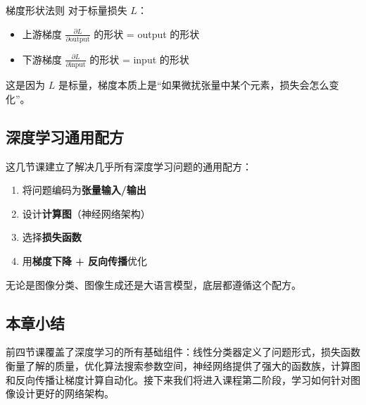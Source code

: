\begin{warningbox}{梯度形状法则}
对于标量损失 $L$：
\begin{itemize}
    \item 上游梯度 $\frac{\partial L}{\partial \text{output}}$ 的形状 = output 的形状
    \item 下游梯度 $\frac{\partial L}{\partial \text{input}}$ 的形状 = input 的形状
\end{itemize}
这是因为 $L$ 是标量，梯度本质上是``如果微扰张量中某个元素，损失会怎么变化''。
\end{warningbox}

\subsection{深度学习通用配方}

这几节课建立了解决几乎所有深度学习问题的通用配方：

\begin{enumerate}
    \item 将问题编码为\textbf{张量输入/输出}
    \item 设计\textbf{计算图}（神经网络架构）
    \item 选择\textbf{损失函数}
    \item 用\textbf{梯度下降 + 反向传播}优化
\end{enumerate}

无论是图像分类、图像生成还是大语言模型，底层都遵循这个配方。

\subsection{本章小结}

前四节课覆盖了深度学习的所有基础组件：线性分类器定义了问题形式，损失函数衡量了解的质量，优化算法搜索参数空间，神经网络提供了强大的函数族，计算图和反向传播让梯度计算自动化。接下来我们将进入课程第二阶段，学习如何针对图像设计更好的网络架构。


